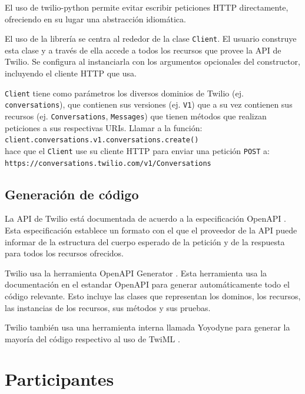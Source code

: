 \documentclass{article}
\begin{document}
El uso de twilio-python permite evitar escribir peticiones HTTP directamente,
ofreciendo en su lugar una abstracción idiomática.

\hfill

El uso de la librería se centra al rededor de la clase \verb|Client|.
El usuario construye esta clase
y a través de ella accede a todos los recursos que provee la API de Twilio.
Se configura al instanciarla con los argumentos opcionales del constructor,
incluyendo el cliente HTTP que usa.

\verb|Client| tiene como parámetros los diversos dominios de Twilio
(ej. \verb|conversations|),
que contienen sus versiones (ej. \verb|V1|)
que a su vez contienen sus recursos
(ej. \verb|Conversations|, \verb|Messages|)
que tienen métodos que realizan peticiones a sus respectivas URIs.
Llamar a la función:
\\ \hspace*{1em} \verb|client.conversations.v1.conversations.create()|
\\hace que el \verb|Client|
use su cliente HTTP para enviar una petición \verb|POST| a:
\\ \hspace*{1em} \verb|https://conversations.twilio.com/v1/Conversations|


\subsection*{Generación de código}

La API de Twilio está documentada
de acuerdo a la especificación OpenAPI
\cite{twilio-openapi}
\cite{twilio-openapi-repo}.
Esta especificación establece un formato
con el que el proveedor de la API
puede informar de la estructura
del cuerpo esperado de la petición
y de la respuesta
para todos los recursos ofrecidos.

Twilio usa la herramienta OpenAPI Generator
\cite{twilio-generated-openapi}.
Esta herramienta usa la documentación en el estandar OpenAPI
para generar automáticamente todo el código relevante.
Esto incluye las clases que representan los dominos,
los recursos, las instancias de los recursos, sus métodos
y sus pruebas.

Twilio también usa una herramienta interna llamada Yoyodyne
para generar la mayoría del código respectivo al uso de TwiML
\cite{twilio-generated-yoyodyne}.


\section{Participantes}
\end{document}
